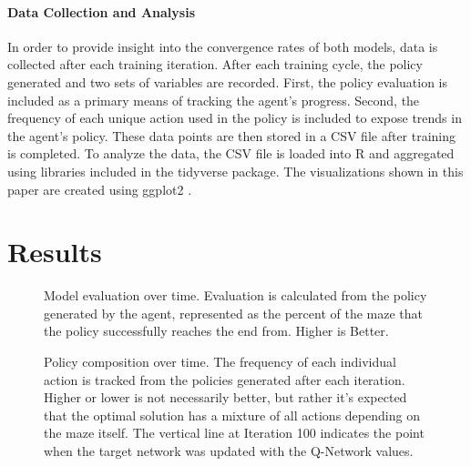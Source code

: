 \documentclass[12pt]{article}
\begin{document}
\paragraph{Data Collection and Analysis}

In order to provide insight into the convergence rates of both models, data is collected after each training iteration.
After each training cycle, the policy generated and two sets of variables are recorded.
First, the policy evaluation is included as a primary means of tracking the agent's progress.
Second, the frequency of each unique action used in the policy is included to expose trends in the agent's policy.
These data points are then stored in a CSV file after training is completed.
To analyze the data, the CSV file is loaded into R \cite{lang_r} and aggregated using libraries included in the tidyverse \cite{lib_tidyverse} package.
The visualizations shown in this paper are created using ggplot2 \cite{lib_ggplot2}.

\section{Results}
%
%
%

\begin{figure}[h]
	\begin{center}
	
	\end{center}
    \caption{Model evaluation over time. Evaluation is calculated from the policy generated by the agent, represented as the percent of the maze that the policy successfully reaches the end from. Higher is Better.}
		\label{fig:evaluation}
\end{figure}

\begin{figure}[h]
	\begin{center}
	
	\end{center}
	\caption{Policy composition over time. The frequency of each individual action is tracked from the policies generated after each iteration. Higher or lower is not necessarily better, but rather it's expected that the optimal solution has a mixture of all actions depending on the maze itself. The vertical line at Iteration 100 indicates the point when the target network was updated with the Q-Network values.}
	\label{fig:directional}
\end{figure}
\end{document}
